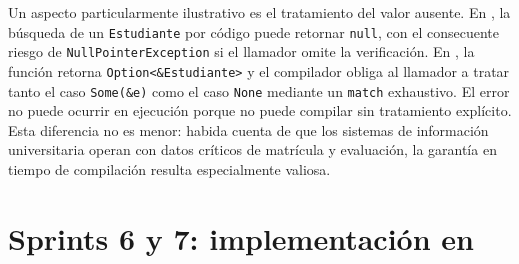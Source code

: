 
\noindent
Un aspecto particularmente ilustrativo es el tratamiento del valor ausente.
En \java, la búsqueda de un \texttt{Estudiante} por código puede retornar \texttt{null},
con el consecuente riesgo de \texttt{NullPointerException} si el llamador omite la
verificación. En \rust, la función retorna \texttt{Option<\&Estudiante>} y el compilador
obliga al llamador a tratar tanto el caso \texttt{Some(\&e)} como el caso \texttt{None}
mediante un \texttt{match} exhaustivo. El error no puede ocurrir en ejecución porque
no puede compilar sin tratamiento explícito. Esta diferencia no es menor:
habida cuenta de que los sistemas de información universitaria operan con datos críticos
de matrícula y evaluación, la garantía en tiempo de compilación resulta especialmente
valiosa.

\section*{Sprints 6 y 7: implementación en \java}
\label{sec:sprints-6-7}

